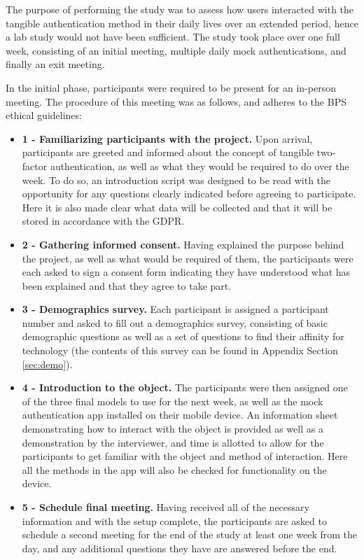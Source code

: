 \documentclass{l4proj}
\begin{document}
The purpose of performing the study was to assess how users interacted with the tangible authentication method in their daily lives over an extended period, hence a lab study would not have been sufficient. The study took place over one full week, consisting of an initial meeting, multiple daily mock authentications, and finally an exit meeting.

In the initial phase, participants were required to be present for an in-person meeting. The procedure of this meeting was as follows, and adheres to the BPS ethical guidelines:
\begin{itemize}
    \item  \textbf{1 - Familiarizing participants with the project.} Upon arrival, participants are greeted and informed about the concept of tangible two-factor authentication, as well as what they would be required to do over the week. To do so, an introduction script was designed to be read with the opportunity for any questions clearly indicated before agreeing to participate. Here it is also made clear what data will be collected and that it will be stored in accordance with the GDPR.
    \item \textbf{2 - Gathering informed consent.} Having explained the purpose behind the project, as well as what would be required of them, the participants were each asked to sign a consent form indicating they have understood what has been explained and that they agree to take part.
    \item \textbf{3 - Demographics survey.} Each participant is assigned a participant number and asked to fill out a demographics survey, consisting of basic demographic questions as well as a set of questions to find their affinity for technology (the contents of this survey can be found in Appendix Section \ref{sec:demo}).
    \item \textbf{4 - Introduction to the object.} The participants were then assigned one of the three final models to use for the next week, as well as the mock authentication app installed on their mobile device. An information sheet demonstrating how to interact with the object is provided as well as a demonstration by the interviewer, and time is allotted to allow for the participants to get familiar with the object and method of interaction. Here all the methods in the app will also be checked for functionality on the device.
    \item \textbf{5 - Schedule final meeting.} Having received all of the necessary information and with the setup complete, the participants are asked to schedule a second meeting for the end of the study at least one week from the day, and any additional questions they have are answered before the end.
\end{itemize}
\end{document}

